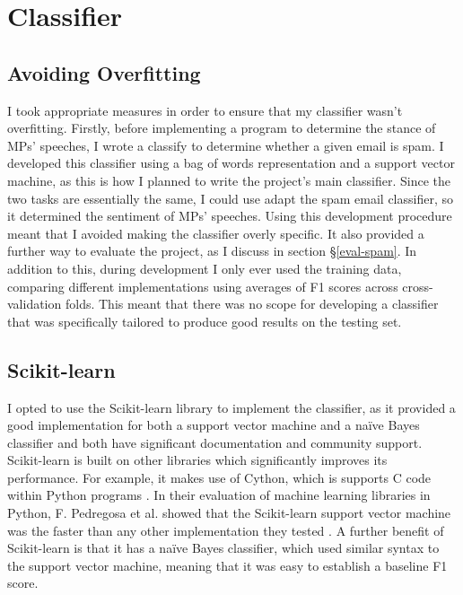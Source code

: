 \documentclass[12pt,a4paper,twoside,openright]{report}
\begin{document}
\section{Classifier} \label{impl-classifier}

\subsection{Avoiding Overfitting}

I took appropriate measures in order to ensure that my classifier wasn't overfitting. Firstly, before implementing a program to determine the stance of MPs' speeches, I wrote a classify to determine whether a given email is spam. I developed this classifier using a bag of words representation and a support vector machine, as this is how I planned to write the project's main classifier. Since the two tasks are essentially the same, I could use adapt the spam email classifier, so it determined the sentiment of MPs' speeches. Using this development procedure meant that I avoided making the classifier overly specific. It also provided a further way to evaluate the project, as I discuss in section \S\ref{eval-spam}. In addition to this, during development I only ever used the training data, comparing different implementations using averages of F1 scores across cross-validation folds. This meant that there was no scope for developing a classifier that was specifically tailored to produce good results on the testing set.

\subsection{Scikit-learn}

I opted to use the Scikit-learn library to implement the classifier, as it provided a good implementation for both a support vector machine and a na\"{i}ve Bayes classifier and both have significant documentation \cite{svmdocs, nbcdocs} and community support. Scikit-learn is built on other libraries which significantly improves its performance. For example, it makes use of Cython, which is supports C code within Python programs \cite{cythondocs}. In their evaluation of machine learning libraries in Python, F. Pedregosa et al. showed that the Scikit-learn support vector machine was the faster than any other implementation they tested \cite{skspeed}. A further benefit of Scikit-learn is that it has a na\"{i}ve Bayes classifier, which used similar syntax to the support vector machine, meaning that it was easy to establish a baseline F1 score.
\end{document}
